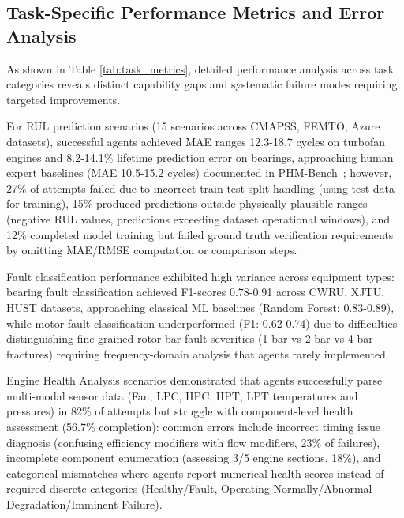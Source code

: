 \documentclass[sigconf, screen, nonacm]{acmart}
\begin{document}
  \subsection{Task-Specific Performance Metrics and Error Analysis}          
  As shown in Table \ref{tab:task_metrics}, detailed performance analysis across task categories reveals distinct capability gaps and systematic failure modes requiring targeted improvements. 
  
  For RUL prediction scenarios (15 scenarios across CMAPSS,    
  FEMTO, Azure datasets), successful agents achieved MAE ranges 12.3-18.7    
  cycles on turbofan engines and 8.2-14.1\% lifetime prediction error on     
  bearings, approaching human expert baselines (MAE 10.5-15.2 cycles)        
  documented in PHM-Bench~\cite{yang2025phmbenchdomainspecificbenchmarkingframework}; however, 27\% of attempts 
  failed due to incorrect train-test split handling (using test data for     
  training), 15\% produced predictions outside physically plausible ranges   
  (negative RUL values, predictions exceeding dataset operational windows),  
  and 12\% completed model training but failed ground truth verification     
  requirements by omitting MAE/RMSE computation or comparison steps. 
  
  Fault   
  classification performance exhibited high variance across equipment types: 
  bearing fault classification achieved F1-scores 0.78-0.91 across CWRU,     
  XJTU, HUST datasets, approaching classical ML baselines (Random Forest:    
  0.83-0.89), while motor fault classification underperformed (F1: 0.62-0.74)
   due to difficulties distinguishing fine-grained rotor bar fault severities
   (1-bar vs 2-bar vs 4-bar fractures) requiring frequency-domain analysis   
  that agents rarely implemented. 
  
  Engine Health Analysis scenarios demonstrated that agents successfully parse     
  multi-modal sensor data (Fan, LPC, HPC, HPT, LPT temperatures and          
  pressures) in 82\% of attempts but struggle with component-level health    
  assessment (56.7\% completion): common errors include incorrect timing     
  issue diagnosis (confusing efficiency modifiers with flow modifiers, 23\%  
  of failures), incomplete component enumeration (assessing 3/5 engine       
  sections, 18\%), and categorical mismatches where agents report numerical  
  health scores instead of required discrete categories (Healthy/Fault,      
  Operating Normally/Abnormal Degradation/Imminent Failure). 
  
\end{document}
